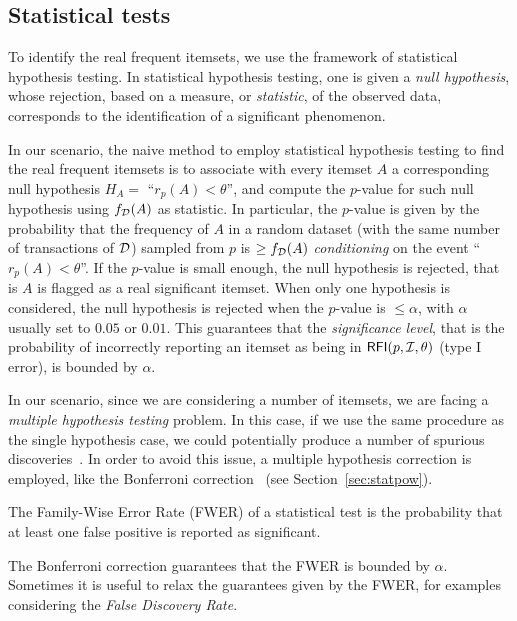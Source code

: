 \subsection{Statistical tests}
\label{sec:stat_tests}

To identify the real frequent itemsets, we use the framework of statistical
hypothesis testing. In statistical hypothesis testing, one is given a \emph{null
hypothesis}, whose rejection, based on a measure, or \emph{statistic}, of the
observed data, corresponds to the identification of a significant phenomenon.

 In our scenario, the naive method to employ statistical hypothesis testing to find the real frequent itemsets is to associate with every itemset $A$ a corresponding null hypothesis $H_A =$ ``$r_p(A) < \theta$'', and compute the $p$-value  for such null hypothesis using  $f_{\cal D} (A)$ as statistic. In particular, the $p$-value is given by the probability that the frequency of $A$ in a random dataset (with the same number of transactions of ${\cal D}$) sampled from $p$ is $\ge f_{\cal D} (A)$ \emph{conditioning} on the event ``$r_p(A)< \theta$''. If the $p$-value is small enough, the null hypothesis is rejected, that is $A$ is flagged as a real significant itemset. When only one hypothesis is considered, the null hypothesis is rejected when the $p$-value is $\le \alpha$, with $\alpha$ usually set to $0.05$ or $0.01$. This guarantees that the  \emph{significance level}, that is the probability of incorrectly reporting an itemset as being in $\mathsf{RFI}(p,{\cal I},\theta)$ (type I error), is bounded by $\alpha$.

In our scenario, since we are considering a number of itemsets, we are facing a
\emph{multiple hypothesis testing} problem. In this case, if we use the same
procedure as the single hypothesis case, we could potentially produce a number
of spurious discoveries~\cite{LiuZW11}. In order to avoid this issue, a multiple
hypothesis correction is employed, like the Bonferroni
correction~\cite{DudoitSB03} (see Section~\ref{sec:statpow}).

\begin{definition}\label{def:FWER}
  The Family-Wise Error Rate (FWER) of a statistical test is the probability that at
  least one false positive is reported as significant.
\end{definition}

The Bonferroni correction guarantees that the FWER is bounded by $\alpha$. Sometimes it is useful to relax the guarantees given by the FWER, for examples considering the \emph{False Discovery Rate}.

